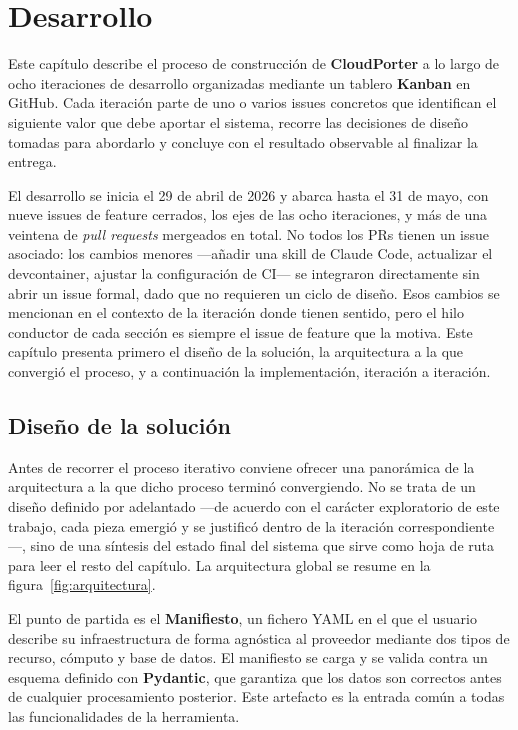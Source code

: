 \chapter{Desarrollo}\label{cap:desarrollo}

Este capítulo describe el proceso de construcción de \textbf{CloudPorter} a lo largo de ocho
iteraciones de desarrollo organizadas mediante un tablero \textbf{Kanban} en GitHub. Cada iteración
parte de uno o varios issues concretos que identifican el siguiente valor que debe aportar el
sistema, recorre las decisiones de diseño tomadas para abordarlo y concluye con el resultado
observable al finalizar la entrega.

El desarrollo se inicia el 29 de abril de 2026 y abarca hasta el 31 de mayo, con nueve issues
de feature cerrados, los ejes de las ocho iteraciones, y más de una veintena de
\textit{pull requests} mergeados en total. No todos los PRs tienen un issue asociado: los
cambios menores —añadir una skill de Claude Code, actualizar el devcontainer, ajustar la
configuración de CI— se integraron directamente sin abrir un issue formal, dado que no
requieren un ciclo de diseño. Esos cambios se mencionan en el contexto de la iteración donde
tienen sentido, pero el hilo conductor de cada sección es siempre el issue de feature que la
motiva. Este capítulo presenta primero el diseño de la solución, la arquitectura a la que
convergió el proceso, y a continuación la implementación, iteración a iteración.

\section{Diseño de la solución}
\label{sec:arquitectura}

Antes de recorrer el proceso iterativo conviene ofrecer una panorámica de la arquitectura a la
que dicho proceso terminó convergiendo. No se trata de un diseño definido por adelantado —de
acuerdo con el carácter exploratorio de este trabajo, cada pieza emergió y se justificó dentro de
la iteración correspondiente—, sino de una síntesis del estado final del sistema que sirve como
hoja de ruta para leer el resto del capítulo. La arquitectura global se resume en la
figura~\ref{fig:arquitectura}.

El punto de partida es el \textbf{Manifiesto}, un fichero YAML en el que el usuario describe su
infraestructura de forma agnóstica al proveedor mediante dos tipos de recurso, cómputo y base de
datos. El manifiesto se carga y se valida contra un esquema definido con \textbf{Pydantic}, que
garantiza que los datos son correctos antes de cualquier procesamiento posterior. Este artefacto
es la entrada común a todas las funcionalidades de la herramienta.

